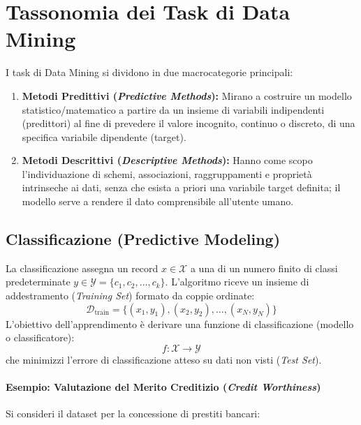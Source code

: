 \FloatBarrier
\section{Tassonomia dei Task di Data Mining}

I task di Data Mining si dividono in due macrocategorie principali:
\begin{enumerate}
    \item \textbf{Metodi Predittivi (\textit{Predictive Methods}):} Mirano a costruire un modello statistico/matematico a partire da un insieme di variabili indipendenti (predittori) al fine di prevedere il valore incognito, continuo o discreto, di una specifica variabile dipendente (target).
    \item \textbf{Metodi Descrittivi (\textit{Descriptive Methods}):} Hanno come scopo l'individuazione di schemi, associazioni, raggruppamenti e propriet\`a intrinseche ai dati, senza che esista a priori una variabile target definita; il modello serve a rendere il dato comprensibile all'utente umano.
\end{enumerate}

\FloatBarrier
\subsection{Classificazione (Predictive Modeling)}
La classificazione assegna un record $x \in \mathcal{X}$ a una di un numero finito di classi predeterminate $y \in \mathcal{Y} = \{c_1, c_2, \dots, c_k\}$. L'algoritmo riceve un insieme di addestramento (\textit{Training Set}) formato da coppie ordinate:
\begin{equation}
    \mathcal{D}_{\text{train}} = \{(x_1, y_1), (x_2, y_2), \dots, (x_N, y_N)\}
\end{equation}
L'obiettivo dell'apprendimento \`e derivare una funzione di classificazione (modello o classificatore):
\begin{equation}
    f: \mathcal{X} \to \mathcal{Y}
\end{equation}
che minimizzi l'errore di classificazione atteso su dati non visti (\textit{Test Set}).

\paragraph{Esempio: Valutazione del Merito Creditizio (\textit{Credit Worthiness})}
Si consideri il dataset per la concessione di prestiti bancari:

